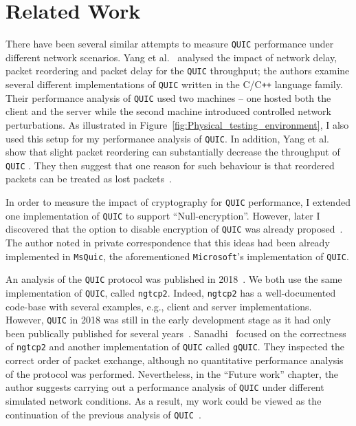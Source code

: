 \documentclass[12pt,a4paper]{report}
\begin{document}
\section{Related Work}
There have been several similar attempts to measure \texttt{QUIC} performance under different network scenarios. 
Yang et al.~\cite{Making_QUIC_Quicker} analysed the impact of network delay, packet reordering and packet delay for the \texttt{QUIC} throughput; the authors examine several different implementations of \texttt{QUIC} written in the C/C\texttt{++} language family.
Their performance analysis of \texttt{QUIC} used two machines -- one hosted both the client and the server while the second machine introduced controlled network perturbations.
As illustrated in Figure~\ref{fig:Physical_testing_environment}, I also used this setup for my performance analysis of \texttt{QUIC}.
In addition, Yang et al.~\cite{Making_QUIC_Quicker} show that slight packet reordering can substantially decrease the throughput of \texttt{QUIC} .
They then suggest that one reason for such behaviour is that reordered packets can be treated as lost packets~\cite{Making_QUIC_Quicker}. 


In order to measure the impact of cryptography for \texttt{QUIC} performance, I extended one implementation of \texttt{QUIC} to support \enquote{Null-encryption}.
However, later I discovered that the option to disable encryption of \texttt{QUIC} was already proposed~\cite{banks-quic-disable-encryption-00}.
The author noted in private correspondence that this ideas had been already implemented in \texttt{MsQuic}, the aforementioned \texttt{Microsoft}'s implementation of \texttt{QUIC}.



An analysis of the \texttt{QUIC} protocol was published in 2018~\cite{overview_of_the_QUIC_protocol}.
We both use the same implementation of \texttt{QUIC}, called \texttt{ngtcp2}.
Indeed, \texttt{ngtcp2} has a well-documented code-base with several examples, e.g., client and server implementations.   
However, \texttt{QUIC} in 2018 was still in the early development stage as it had only been publically published for several years~\cite{Chromium_Blog_Experimenting_with_quic}.
Sanadhi~\cite{overview_of_the_QUIC_protocol} focused on the correctness of \texttt{ngtcp2} and another implementation of \texttt{QUIC} called \texttt{gQUIC}.
They inspected the correct order of packet exchange, although no quantitative performance analysis of the protocol was performed.
Nevertheless, in the \enquote{Future work} chapter, the author suggests carrying out a performance analysis of \texttt{QUIC} under different simulated network conditions.
As a result, my work could be viewed as the continuation of the previous analysis of \texttt{QUIC}~\cite{overview_of_the_QUIC_protocol}.
\end{document}
